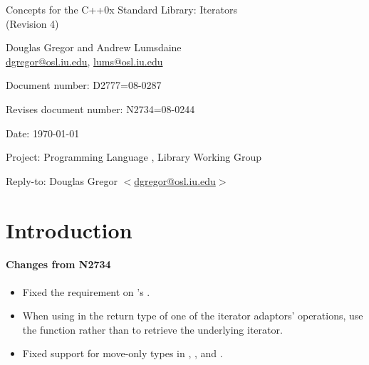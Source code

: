 \documentclass[american,twoside]{book}
\begin{document}
\raggedbottom

\begin{titlepage}
\begin{center}
\huge
Concepts for the C++0x Standard Library: Iterators \\
(Revision 4)
\vspace{0.5in}

\normalsize
Douglas Gregor and Andrew Lumsdaine \\
\href{mailto:dgregor@osl.iu.edu}{dgregor@osl.iu.edu}, \href{mailto:lums@osl.iu.edu}{lums@osl.iu.edu}
\end{center}

\vspace{1in}
\par\noindent Document number: D2777=08-0287 \vspace{-6pt}
\par\noindent Revises document number: N2734=08-0244 \vspace{-6pt}
\par\noindent Date: \today\vspace{-6pt}
\par\noindent Project: Programming Language \Cpp{}, Library Working Group\vspace{-6pt}
\par\noindent Reply-to: Douglas Gregor $<$\href{mailto:dgregor@osl.iu.edu}{dgregor@osl.iu.edu}$>$\vspace{-6pt}

\section*{Introduction}

\paragraph*{Changes from N2734}
\begin{itemize}
\item Fixed the  requirement on
  's .
\item When using  in the return type of one of the
  iterator adaptors'  operations, use the
   function rather than  to retrieve the
  underlying iterator.
\item Fixed support for move-only types in , , and .
\end{itemize}
\end{titlepage}
\end{document}
